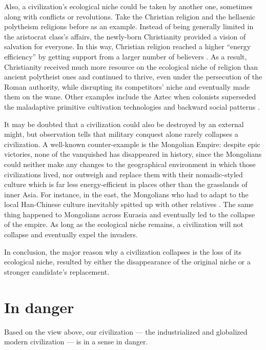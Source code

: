 \documentclass[a4paper,12pt]{article}
\begin{document}
    Also, a civilization's ecological niche could be taken by another one, sometimes along with conflicts or revolutions.
    Take the Christian religion and the hellaenic polytheism religions before as an example.
    Instead of being generally limited in the aristocrat class's affairs, the newly-born Christianity provided a vision of salvation for everyone.
    In this way, Christian religion reached a higher ``energy efficiency'' by getting support from a larger number of believers \cite{2018_ChristianCareForPoor}.
    As a result, Christianity received much more resource on the ecological niche of religion than ancient polytheist ones and continued to thrive, even under the persecution of the Roman authority, while disrupting its competitors' niche and eventually made them on the wane.
    Other examples include the Aztec when colonists superseded the maladaptive primitive cultivation technologies and backward social patterns \cite{2016_WhyCivFail}.
    
    It may be doubted that a civilization could also be destroyed by an external might, but observation tells that military conquest alone rarely collapses a civilization.
    A well-known counter-example is the Mongolian Empire: despite epic victories, none of the vanquished has disappeared in history, since the Mongolians could neither make any changes to the geographical environment in which those civilizations lived, nor outweigh and replace them with their nomadic-styled culture which is far less energy-efficient in places other than the grasslands of inner Asia.
    For instance, in the east, the Mongolians who had to adapt to the local Han-Chinese culture inevitably spitted up with other relatives \cite{2002_MongolCulture}. 
    The same thing happened to Mongolians across Eurasia and eventually led to the collapse of the empire.
    As long as the ecological niche remains, a civilization will not collapse and eventually expel the invaders. 
    
    In conclusion, the major reason why a civilization collapses is the loss of its ecological niche, resulted by either the disappearance of the original niche or a stronger candidate's replacement.
    
    \section{In danger}
    Based on the view above, our civilization --- the industrialized and globalized modern civilization --- is in a sense in danger.
    
\end{document}
